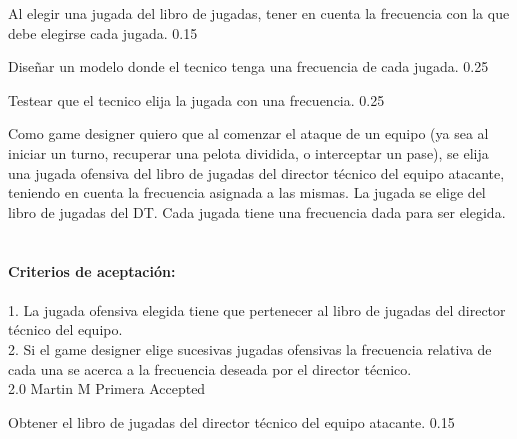 		{Al elegir una jugada del libro de jugadas, tener en cuenta la frecuencia con la que debe elegirse cada jugada.} %
		{} %
		{0.15} %
		{} %
		{} %
		{} %

		{Diseñar un modelo donde el tecnico tenga una frecuencia de cada jugada.} %
		{} %
		{0.25} %
		{} %
		{} %
		{} %


		{Testear que el tecnico elija la jugada con una frecuencia.} %
		{} %
		{0.25} %
		{} %
		{} %
		{} %

\vspace{20pt}


	{Como game designer quiero que al comenzar el ataque de un equipo (ya sea al iniciar un turno, recuperar una pelota dividida, o interceptar un pase), se elija una jugada ofensiva del libro de jugadas del director t\'ecnico del equipo atacante, teniendo en cuenta la frecuencia asignada a las mismas.} %
	{La jugada se elige del libro de jugadas del DT. Cada jugada tiene una frecuencia dada para ser elegida. \\
  \\
  \\
\textbf{Criterios de aceptación:}\\
  \\
1. La jugada ofensiva elegida tiene que pertenecer al libro de jugadas del director técnico del equipo.  \\
2. Si el game designer elige sucesivas jugadas ofensivas la frecuencia relativa de cada una se acerca a la frecuencia deseada por el director técnico. \\
} %
	{} %
	{2.0} %
	{Martin M} %
	{Primera} %
	{Accepted} %

		{Obtener el libro de jugadas del director técnico del equipo atacante.} %
		{} %
		{0.15} %
		{} %
		{} %
		{} %

